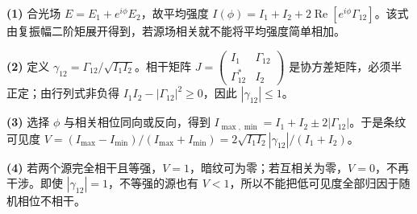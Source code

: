 \par\noindent\textbf{(1)} 合光场 \(E=E_1+e^{i\phi}E_2\)，故平均强度 \(I(\phi)=I_1+I_2+2\operatorname{Re}[e^{i\phi}\Gamma_{12}]\)。该式由复振幅二阶矩展开得到，若源场相关就不能将平均强度简单相加。
\par\noindent\textbf{(2)} 定义 \(\gamma_{12}=\Gamma_{12}/\sqrt{I_1I_2}\)。相干矩阵 \(J=\begin{pmatrix}I_1&\Gamma_{12}\\\Gamma_{12}^*&I_2\end{pmatrix}\) 是协方差矩阵，必须半正定；由行列式非负得 \(I_1I_2-|\Gamma_{12}|^2\ge0\)，因此 \(|\gamma_{12}|\le1\)。
\par\noindent\textbf{(3)} 选择 \(\phi\) 与相关相位同向或反向，得到 \(I_{\max,\min}=I_1+I_2\pm2|\Gamma_{12}|\)。于是条纹可见度 \(V=(I_{\max}-I_{\min})/(I_{\max}+I_{\min})=2\sqrt{I_1I_2}|\gamma_{12}|/(I_1+I_2)\)。
\par\noindent\textbf{(4)} 若两个源完全相干且等强，\(V=1\)，暗纹可为零；若互相关为零，\(V=0\)，不再干涉。即使 \(|\gamma_{12}|=1\)，不等强的源也有 \(V<1\)，所以不能把低可见度全部归因于随机相位不相干。
